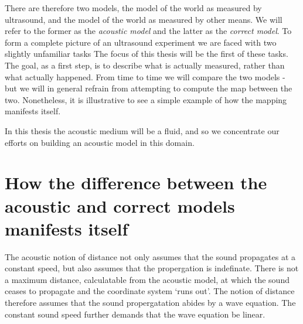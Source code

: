 There are therefore two models,
the model of the world as measured by ultrasound,
and the model of the world as measured by other means.
We will refer to the former as the  {\em acoustic model} and the latter as the  {\em correct model}.
To form a complete picture of an ultrasound experiment we are faced with two slightly unfamiliar tasks
The focus of this thesis will be the first of these tasks.
The goal, as a first step, is to describe what is actually measured,
rather than what actually happened.
From time to time we will compare the two models -
but we will in general refrain from attempting to compute the map between the two.
Nonetheless,
it is illustrative to see a simple example of how the mapping manifests itself.


In this thesis the acoustic medium will be a fluid,
and so we concentrate our efforts on building an acoustic model in this domain.





\section{How the difference between the acoustic and correct models manifests itself}

The acoustic notion of distance not only assumes
that the sound propagates at a constant speed,
but also assumes that the propergation is indefinate.
There is not a maximum distance,
calculatable from the acoustic model,
at which the sound ceases to propagate and the coordinate system `runs out'.
The notion of distance therefore assumes that the sound propergatation abides by a wave equation.
The constant sound speed further demands that the wave equation be linear.



